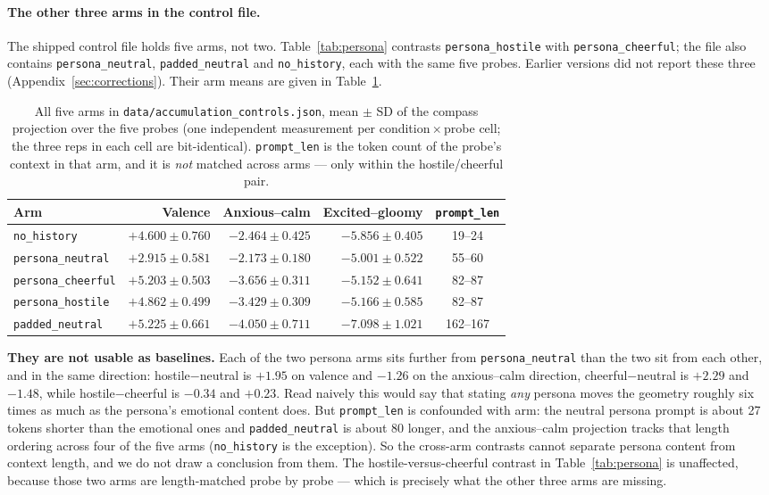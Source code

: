 \documentclass[11pt,a4paper]{article}
\begin{document}
\paragraph{The other three arms in the control file.} The shipped control
file holds five arms, not two. Table~\ref{tab:persona} contrasts
\texttt{persona\_hostile} with \texttt{persona\_cheerful}; the file also
contains \texttt{persona\_neutral}, \texttt{padded\_neutral} and
\texttt{no\_history}, each with the same five probes. Earlier versions
did not report these three (Appendix~\ref{sec:corrections}). Their arm means are
given in Table~\ref{tab:persona_arms}.

\begin{table}[H]
\centering
\caption{All five arms in \texttt{data/accumulation\_controls.json}, mean
$\pm$ SD of the compass projection over the five probes (one independent
measurement per condition\,$\times$\,probe cell; the three reps in each cell
are bit-identical). \texttt{prompt\_len} is the token count of the probe's
context in that arm, and it is \emph{not} matched across arms --- only within
the hostile/cheerful pair.}
\label{tab:persona_arms}
\begin{tabular}{lrrrc}
\toprule
Arm & Valence & Anxious--calm & Excited--gloomy & \texttt{prompt\_len} \\
\midrule
\texttt{no\_history} & $+4.600 \pm 0.760$ & $-2.464 \pm 0.425$ & $-5.856 \pm 0.405$ & 19--24 \\
\texttt{persona\_neutral} & $+2.915 \pm 0.581$ & $-2.173 \pm 0.180$ & $-5.001 \pm 0.522$ & 55--60 \\
\texttt{persona\_cheerful} & $+5.203 \pm 0.503$ & $-3.656 \pm 0.311$ & $-5.152 \pm 0.641$ & 82--87 \\
\texttt{persona\_hostile} & $+4.862 \pm 0.499$ & $-3.429 \pm 0.309$ & $-5.166 \pm 0.585$ & 82--87 \\
\texttt{padded\_neutral} & $+5.225 \pm 0.661$ & $-4.050 \pm 0.711$ & $-7.098 \pm 1.021$ & 162--167 \\
\bottomrule
\end{tabular}
\end{table}

\textbf{They are not usable as baselines.} Each of the two persona arms sits further from
\texttt{persona\_neutral} than the two sit from each other, and in the same
direction: hostile$-$neutral is $+1.95$ on valence and $-1.26$ on
the anxious--calm direction, cheerful$-$neutral is $+2.29$ and $-1.48$, while
hostile$-$cheerful is $-0.34$ and $+0.23$. Read naively this would say that
stating \emph{any} persona moves the geometry roughly six times as much as
the persona's emotional content does. But \texttt{prompt\_len} is confounded
with arm: the neutral persona prompt is about 27 tokens shorter than the
emotional ones and \texttt{padded\_neutral} is about 80 longer, and the
anxious--calm projection tracks that length ordering across four of the five
arms (\texttt{no\_history} is the exception). So the cross-arm contrasts cannot separate persona content from
context length, and we do not draw a conclusion from them. The
hostile-versus-cheerful contrast in Table~\ref{tab:persona} is unaffected,
because those two arms are length-matched probe by probe --- which is
precisely what the other three arms are missing.
\end{document}

